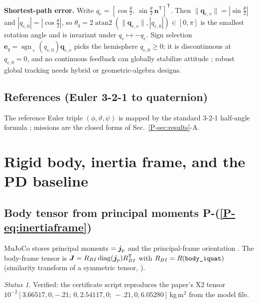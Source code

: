\documentclass[11pt]{article}
\newcommand{\srcroot}{../../..}
\newcommand{\T}{^{\mathsf T}}
\newcommand{\sgnp}{\operatorname{sgn}_{+}}
\newcommand{\PE}[1]{P-(\ref{P-#1})}          %
\newcommand{\PT}[1]{\ref{P-#1}}               %
\newcommand{\code}[1]{\texttt{\detokenize{#1}}}
\theoremstyle{remark}
\newtheorem*{status}{Status}
\newcommand{\listing}[4]{%
  }
\begin{document}
\textbf{Shortest-path error.} Write $q_e=[\cos\frac\theta2,\ \sin\frac\theta2\,\bm n\T]\T$. Then
$\|\bm q_{e,v}\|=|\sin\frac\theta2|$ and $|q_{e,0}|=|\cos\frac\theta2|$, so
$\theta_q=2\operatorname{atan2}(\|\bm q_{e,v}\|,|q_{e,0}|)\in[0,\pi]$ is the smallest rotation angle and is
invariant under $q_e\mapsto-q_e$. Sign selection $\bm e_q=\sgnp(q_{e,0})\bm q_{e,v}$ picks the hemisphere
$q_{e,0}\ge0$; it is discontinuous at $q_{e,0}=0$, and no continuous feedback can globally stabilize
attitude \cite{bhat2000topological,chaturvedi2011rigid}; robust global tracking needs hybrid
\cite{mayhew2011hybrid} or geometric-algebra \cite{rubioscola2026ga,escamilla2023ga} designs.
\listing{src/gra_control/math3d.py}{40}{51}{error quaternion, $\sgnp$ (\code{if qe[0] < 0}), angle $\theta_q$}

\subsection{References (Euler 3-2-1 to quaternion)}
The reference Euler triple $(\phi,\vartheta,\psi)$ is mapped by the standard 3-2-1 half-angle formula
\cite{diebel2006quaternion}; missions are the closed forms of Sec.~\PT{sec:results}-A.
\listing{src/gra_control/math3d.py}{28}{37}{3-2-1 Euler to quaternion}
\listing{src/gra_control/math3d.py}{54}{82}{mission references (Roll, Full3, Hard45, Hardstep, Yaw360)}

\section{Rigid body, inertia frame, and the PD baseline}
\subsection{Body tensor from principal moments \PE{eq:inertiaframe}}
MuJoCo stores principal moments \code{body_inertia} $=\bm j_{\rm p}$ and the principal-frame orientation
\code{body_iquat}. The body-frame tensor is $\bm J=R_{BI}\operatorname{diag}(\bm j_{\rm p})R_{BI}\T$ with
$R_{BI}=R(\text{\code{body_iquat}})$ (similarity transform of a symmetric tensor, \cite{schaub2018amss}).
\begin{status}Verified: the certificate script reproduces the paper's X2 tensor
$10^{-2}[3.66517,0,-.21;\,0,2.54117,0;\,-.21,0,6.05280]$\,kg\,m$^2$ from the model file.\end{status}
\listing{experiments/theory_certificate_2026-09-12/compute_local_certificate.py}{92}{101}{$\bm J$ from \code{body_iquat} and \code{body_inertia}}
\end{document}
